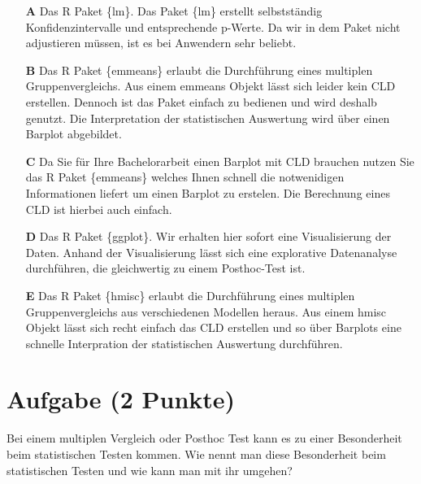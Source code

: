 \documentclass[a4paper, 9pt]{scrartcl}\usepackage[]{graphicx}\usepackage[]{xcolor}
\begin{document}
\begin{enumerate}
\item [\textbf{A} \msquare] Das R Paket \{lm\}. Das Paket \{lm\} erstellt selbstständig Konfidenzintervalle und entsprechende p-Werte. Da wir in dem Paket nicht adjustieren müssen, ist es bei Anwendern sehr beliebt.
\item [\textbf{B} \msquare] Das R Paket \{emmeans\} erlaubt die Durchführung eines multiplen Gruppenvergleichs. Aus einem emmeans Objekt lässt sich leider kein CLD erstellen. Dennoch ist das Paket einfach zu bedienen und wird deshalb genutzt. Die Interpretation der statistischen Auswertung wird über einen Barplot abgebildet.
\item [\textbf{C} \msquare] Da Sie für Ihre Bachelorarbeit einen Barplot mit CLD brauchen nutzen Sie das R Paket \{emmeans\} welches Ihnen schnell die notwenidigen Informationen liefert um einen Barplot zu erstelen. Die Berechnung eines CLD ist hierbei auch einfach.
\item [\textbf{D} \msquare] Das R Paket \{ggplot\}. Wir erhalten hier sofort eine Visualisierung der Daten. Anhand der Visualisierung lässt sich eine explorative Datenanalyse durchführen, die gleichwertig zu einem Posthoc-Test ist.
\item [\textbf{E} \msquare] Das R Paket \{hmisc\} erlaubt die Durchführung eines multiplen Gruppenvergleichs aus verschiedenen Modellen heraus. Aus einem hmisc Objekt lässt sich recht einfach das CLD erstellen und so über Barplots eine schnelle Interpration der statistischen Auswertung durchführen.
\end{enumerate}

\section{Aufgabe \hfill (2 Punkte)}



Bei einem multiplen Vergleich oder Posthoc Test kann es zu einer Besonderheit beim statistischen Testen kommen. Wie nennt man diese Besonderheit beim statistischen Testen und wie kann man mit ihr umgehen?
\end{document}
